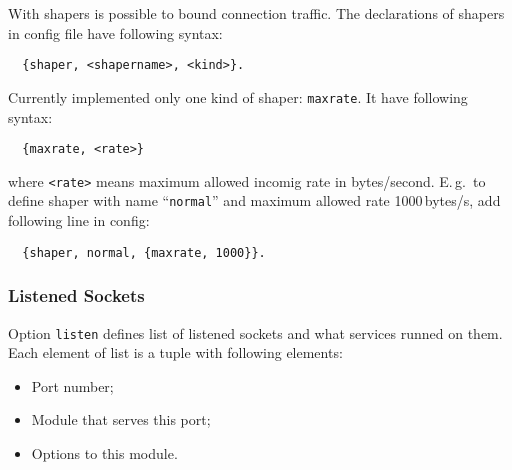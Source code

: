 \documentclass[a4paper,10pt]{article}
\newcommand{\option}[1]{\texttt{#1}}
\newcommand{\term}[1]{\texttt{#1}}
\begin{document}
With shapers is possible to bound connection traffic.  The declarations of
shapers in config file have following syntax:
\begin{verbatim}
  {shaper, <shapername>, <kind>}.
\end{verbatim}
Currently implemented only one kind of shaper: \term{maxrate}.  It have
following syntax:
\begin{verbatim}
  {maxrate, <rate>}
\end{verbatim}
where \term{<rate>} means maximum allowed incomig rate in bytes/second.
E.\,g.\ to define shaper with name ``\term{normal}'' and maximum allowed rate
1000\,bytes/s, add following line in config:
\begin{verbatim}
  {shaper, normal, {maxrate, 1000}}.
\end{verbatim}


\subsubsection{Listened Sockets}
\label{sec:configlistened}

Option \option{listen} defines list of listened sockets and what services
runned on them.  Each element of list is a tuple with following elements:
\begin{itemize}
\item Port number;
\item Module that serves this port;
\item Options to this module.
\end{itemize}
\end{document}
